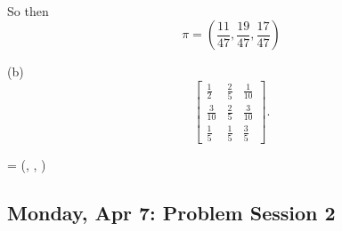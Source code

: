 \documentclass[10pt, oneside]{article}
\theoremstyle{definition}
\begin{document}
\begin{enumerate}
\begin{solution}
\begin{align*}
        \end{align*}
        So then 
        \[\pi = (\frac{11}{47}, \frac{19}{47}, \frac{17}{47})\]
    \end{solution}
    (b)
    \[
    \begin{bmatrix}
        \frac{1}{2} & \frac{2}{5} & \frac{1}{10} \\
        \frac{3}{10} & \frac{2}{5} & \frac{3}{10} \\
        \frac{1}{5} & \frac{1}{5} & \frac{3}{5}
    \end{bmatrix}.
    \]
    \begin{solution}
        \pi = (, , )
    \end{solution}
\end{enumerate}

\newpage
\subsection{Monday, Apr 7: Problem Session 2}
\end{document}
